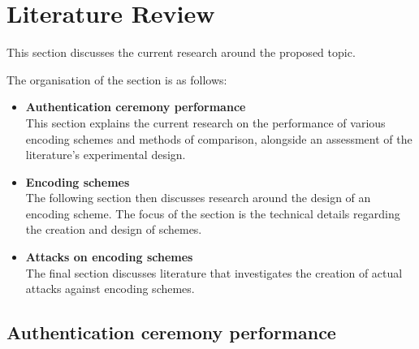 \section{Literature Review}
This section discusses the current research around the proposed topic.

The organisation of the section is as follows:

\begin{itemize}
    \item \textbf{Authentication ceremony performance} \\
    This section explains the current research on the performance of various encoding schemes and methods of comparison, alongside an assessment of the literature's experimental design.

    \item \textbf{Encoding schemes} \\
    The following section then discusses research around the design of an encoding scheme. The focus of the section is the technical details regarding the creation and design of schemes. 

    \item \textbf{Attacks on encoding schemes} \\
    The final section discusses literature that investigates the creation of actual attacks against encoding schemes.
\end{itemize}

\subsection{Authentication ceremony performance}

